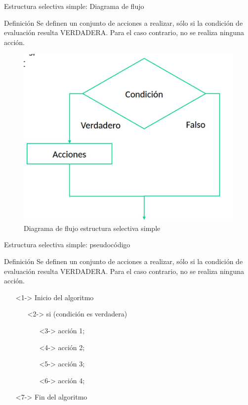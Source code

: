 \documentclass[xcolor=pdftex,table,11pt]{beamer}
\begin{document}
\begin{frame}{Estructura selectiva simple: Diagrama de flujo}
\begin{block}{Definición}
Se definen un conjunto de acciones a realizar, sólo si la condición de evaluación resulta VERDADERA. Para el caso contrario, no se realiza ninguna acción. 
\end{block}


 \begin{figure}
 \centering
\includegraphics[scale=0.3]{../img/exported/if.png}
\caption{Diagrama de flujo estructura selectiva simple}
\end{figure}

\end{frame}


\begin{frame}{Estructura selectiva simple: pseudocódigo}
\begin{block}{Definición}
Se definen un conjunto de acciones a realizar, sólo si la condición de evaluación resulta VERDADERA. Para el caso contrario, no se realiza ninguna acción. 
\end{block}

 \begin{itemize}
   \item[]<1-> Inicio del algoritmo

   \begin{itemize}
   
     	\item[]<2-> si (condición es verdadera)
     	\begin{itemize}
     			\item[]<3->  acción 1;
     			\item[]<4->  acción 2;
     			\item[]<5->  acción 3;
     			\item[]<6->  acción 4;
     	\end{itemize}
     	 
   \end{itemize}
  \item[]<7-> Fin del algoritmo
\end{itemize}

\end{frame}
\end{document}
